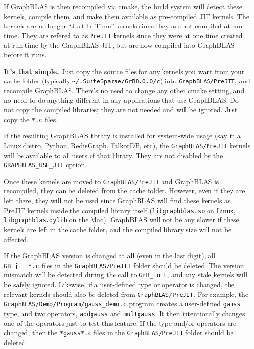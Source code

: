 If GraphBLAS is then recompiled via cmake, the build system will detect these
kernels, compile them, and make them available as pre-compiled JIT kernels.
The kernels are no longer ``Just-In-Time'' kernels since they are not compiled
at run-time.  They are refered to as \verb'PreJIT' kernels since they were at
one time created at run-time by the GraphBLAS JIT, but are now compiled into
GraphBLAS before it runs.

{\bf It's that simple.}  Just copy the source files for any kernels you want
from your cache folder (typically \verb'~/.SuiteSparse/GrB8.0.0/c') into
\verb'GraphBLAS/PreJIT', and recompile GraphBLAS.  There's no need to change
any other cmake setting, and no need to do anything different in any
applications that use GraphBLAS.  Do not copy the compiled libraries; they are
not needed and will be ignored.  Just copy the \verb'*.c' files.

If the resulting GraphBLAS library is installed for system-wide usage (say in a
Linux distro, Python, RedisGraph, FalkorDB, etc), the \verb'GraphBLAS/PreJIT'
kernels will be available to all users of that library.  They are not disabled
by the \verb'GRAPHBLAS_USE_JIT' option.

Once these kernels are moved to \verb'GraphBLAS/PreJIT' and GraphBLAS is
recompiled, they can be deleted from the cache folder.  However, even if they
are left there, they will not be used since GraphBLAS will find these kernels
as PreJIT kernels inside the compiled library itself (\verb'libgraphblas.so' on
Linux, \verb'libgraphblas.dylib' on the Mac).  GraphBLAS will not be any slower
if these kernels are left in the cache folder, and the compiled library size
will not be affected.

If the GraphBLAS version is changed at all (even in the last digit), all
\verb'GB_jit_*.c' files in the \verb'GraphBLAS/PreJIT' folder should be
deleted.  The version mismatch will be detected during the call to
\verb'GrB_init', and any stale kernels will be safely ignored.  Likewise, if a
user-defined type or operator is changed, the relevant kernels should also be
deleted from \verb'GraphBLAS/PreJIT'.  For example, the
\verb'GraphBLAS/Demo/Program/gauss_demo.c' program creates a user-defined
\verb'gauss' type, and two operators, \verb'addgauss' and \verb'multgauss'.  It
then intentionally changes one of the operators just to test this feature.  If
the type and/or operators are changed, then the \verb'*gauss*.c' files in the
\verb'GraphBLAS/PreJIT' folder should be deleted.

